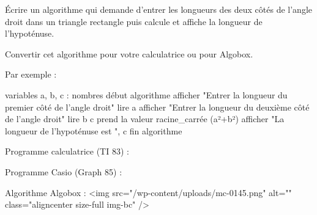 
%
Écrire un algorithme qui demande d'entrer les longueurs des deux côtés de l'angle droit dans un triangle rectangle puis calcule et affiche la longueur de l'hypoténuse.
\par
Convertir cet algorithme pour votre calculatrice ou pour Algobox.
\begin{corrige}
     Par exemple :
\begin{code}
variables
   a, b, c : nombres
début algorithme
   afficher "Entrer la longueur du premier côté de l'angle droit"
   lire a
   afficher "Entrer la longueur du deuxième côté de l'angle droit"
   lire b
   c prend la valeur racine_carrée (a²+b²)
   afficher "La longueur de l'hypoténuse est ", c
fin algorithme
\end{code}
     Programme calculatrice (TI 83) :
\begin{center}
\end{center}

     Programme Casio (Graph 85) :
\begin{center}
\end{center}
     Algorithme Algobox :
     <img src="/wp-content/uploads/mc-0145.png" alt="" class="aligncenter size-full  img-bc" />
\end{corrige}
